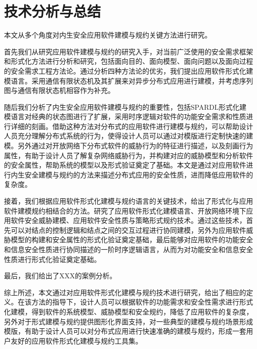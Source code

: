 \chapter{技术分析与总结}
\par
本文从多个角度对内生安全应用软件建模与规约关键方法进行研究。
\par
首先我们从研究应用软件建模与规约的研究入手，对当前广泛使用的安全需求框架和形式化方法进行分析和研究，包括面向目的、面向模型、面向问题以及面向过程的安全需求工程方法论。通过分析四种方法论的优劣，我们提出应用软件形式化建模语言。采用通信有限状态机及其扩展来对异步分布式应用进行建模，并考虑序列图与通信有限状态机相容作为补充。
\par
随后我们分析了内生安全应用软件建模与规约的重要性，包括SPARDL形式化建模语言对经典的状态图进行了扩展，采用时序逻辑对软件的功能安全需求和性质进行详细的刻画。借助这种方法对分布式的应用软件进行建模与规约，可以帮助设计人员充分理解分布式系统的行为，使得设计人员可以通过对模版进行定制快速的建模。另外通过对开放网络下分布式软件的威胁行为的特征进行描述，以及刻画行为属性，有助于设计人员了解复杂网络威胁行为，并构建对应的威胁模型和分析软件的安全属性，帮助系统的模型以及形式验证奠定了基础。本文是通过对应用软件进行内生安全建模与规约的方法来描述分布式应用的安全性质，进而降低应用软件的复杂度。
\par
接着，我们根据应用软件形式化建模与规约语言的关键技术，给出了形式化与应用软件建模规约相结合的方法。研究了应用软件形式化建模语言、开放网络环境下应用软件安全威胁建模、应用软件安全性质与策略形式规约技术。通过这些技术，首先可以对结点的控制逻辑和结点之间的交互过程进行协同建模，另外为应用软件威胁模型的构建和安全属性的形式化验证奠定基础，最后能够对应用软件的功能安全和信息安全性质进行协同描述的一阶时序逻辑语言，从而为对功能安全和信息安全性质进行形式化验证奠定基础。
\par
最后，我们给出了XXX的案例分析。
\par
综上所述，本文通过对应用软件形式化建模与规约技术进行研究，给出了相应的定义。在该方法的指导下，设计人员可以根据软件的功能需求和安全性需求进行形式化建模，得到软件的系统模型、威胁模型和安全规约，降低了应用软件的复杂度，另外对于形式建模与规约提供图形化界面支持，对一些典型的建模与规约场景形成模版，有助于设计人员可以对分布式应用进行快速准确的建模与规约，形成一套用户友好的应用软件形式化建模与规约工具集。
